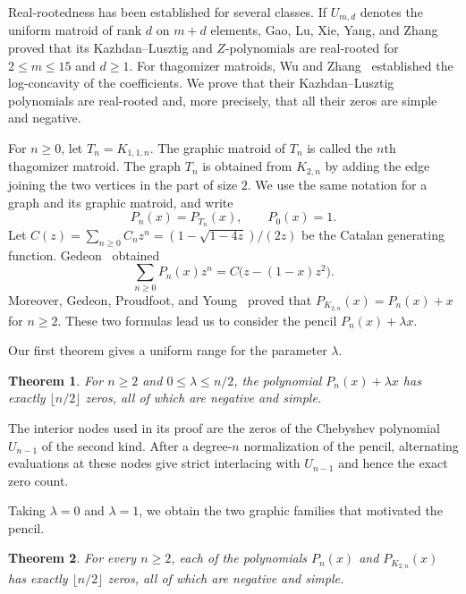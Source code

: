 \documentclass[11pt]{article}
\theoremstyle{plain}
\newtheorem{theorem}{Theorem}[section]
\theoremstyle{remark}
\begin{document}
Real-rootedness has been established for several classes.  If
$U_{m,d}$ denotes the uniform matroid of rank $d$ on $m+d$ elements,
Gao, Lu, Xie, Yang, and Zhang~\cite{GaoLuXieYangZhangUniform} proved
that its Kazhdan--Lusztig and $Z$-polynomials are real-rooted for
$2\le m\le15$ and $d\ge1$.  For thagomizer matroids, Wu and
Zhang~\cite{WuZhangThagomizerLogConcavity} established the
log-concavity of the coefficients.  We prove that their
Kazhdan--Lusztig polynomials are real-rooted and, more precisely, that
all their zeros are simple and negative.

For $n\ge0$, let $T_n=K_{1,1,n}$.  The graphic matroid of $T_n$ is
called the $n$th thagomizer matroid.  The graph $T_n$ is obtained from
$K_{2,n}$ by adding the edge joining the two vertices in the part of
size $2$.  We use the same notation for a graph and its graphic
matroid, and write
\[
P_n(x)=P_{T_n}(x),\qquad P_0(x)=1.
\]
Let $C(z)=\sum_{n\ge0}C_nz^n=(1-\sqrt{1-4z})/(2z)$ be the Catalan
generating function.  Gedeon~\cite[Theorem~1(2)]{Gedeon} obtained
\begin{equation}\label{eq:ThagGF}
   \sum_{n\ge0}P_n(x)z^n=C\bigl(z-(1-x)z^2\bigr).
\end{equation}
Moreover, Gedeon, Proudfoot, and Young~\cite[Theorem~5.8]{GPY}
proved that $P_{K_{2,n}}(x)=P_n(x)+x$ for $n\ge2$.  These two
formulas lead us to consider the pencil $P_n(x)+\lambda x$.

Our first theorem gives a uniform range for the parameter $\lambda$.

\begin{theorem}\label{thm:KLpencil}
For $n\ge2$ and $0\le\lambda\le n/2$, the polynomial
$P_n(x)+\lambda x$ has exactly $\lfloor n/2\rfloor$ zeros, all of
which are negative and simple.
\end{theorem}

The interior nodes used in its proof are the zeros of the Chebyshev
polynomial $U_{n-1}$ of the second kind.  After a degree-$n$
normalization of the pencil, alternating evaluations at these nodes
give strict interlacing with $U_{n-1}$ and hence the exact zero count.

Taking $\lambda=0$ and $\lambda=1$, we obtain the two graphic
families that motivated the pencil.

\begin{theorem}\label{thm:KLtwoFamilies}
For every $n\ge2$, each of the polynomials $P_n(x)$ and
$P_{K_{2,n}}(x)$ has exactly $\lfloor n/2\rfloor$ zeros, all of
which are negative and simple.
\end{theorem}
\end{document}
